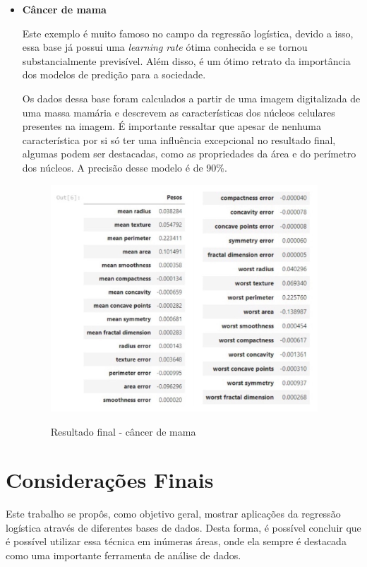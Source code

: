 \documentclass[12pt]{article}
\begin{document}
\begin{itemize}
    
    \item \textbf{Câncer de mama}
    
    \hspace{0.4cm}Este exemplo é muito famoso no campo da regressão logística, devido a isso, essa base já possui uma \textit{learning rate} ótima conhecida e se tornou substancialmente previsível. Além disso, é um ótimo retrato da importância dos modelos de predição para a sociedade.
    
    \hspace{0.4cm}Os dados dessa base foram calculados a partir de uma imagem digitalizada de uma massa mamária e descrevem as características dos núcleos celulares presentes na imagem. É importante ressaltar que apesar de nenhuma característica por si só ter uma influência excepcional no resultado final, algumas podem ser destacadas, como as propriedades da área e do perímetro dos núcleos. A precisão desse modelo é de 90\%. 
    
    \begin{figure}[h]
    \caption{Resultado final - câncer de mama}
    \centering
    \includegraphics[width=10cm]{out5.jpeg}
    \label{figura:out5}
    \end{figure}
\end{itemize}

\clearpage
\section{Considerações Finais}

\hspace{0.4cm}Este trabalho se propôs, como objetivo geral, mostrar aplicações da regressão logística através de diferentes bases de dados. Desta forma, é possível concluir que é possível utilizar essa técnica em inúmeras áreas, onde ela sempre é destacada como uma importante ferramenta de análise de dados. 
\end{document}
